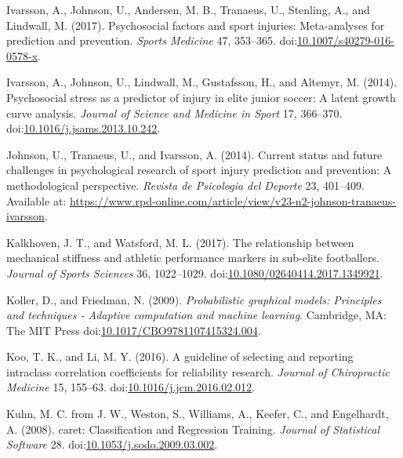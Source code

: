 \documentclass[
]{frontiersHLTH}
\newlength{\cslhangindent}
\newenvironment{cslreferences}%
  {\setlength{\parindent}{0pt}%
  \everypar{\setlength{\hangindent}{\cslhangindent}}\ignorespaces}%
  {\par}
\begin{document}
\begin{cslreferences}
\leavevmode\hypertarget{ref-Ivarsson2017}{}%
Ivarsson, A., Johnson, U., Andersen, M. B., Tranaeus, U., Stenling, A.,
and Lindwall, M. (2017). Psychosocial factors and sport injuries:
Meta-analyses for prediction and prevention. \emph{Sports Medicine} 47,
353--365.
doi:\href{https://doi.org/10.1007/s40279-016-0578-x}{10.1007/s40279-016-0578-x}.

\leavevmode\hypertarget{ref-Ivarsson2014}{}%
Ivarsson, A., Johnson, U., Lindwall, M., Gustafsson, H., and Altemyr, M.
(2014). Psychosocial stress as a predictor of injury in elite junior
soccer: A latent growth curve analysis. \emph{Journal of Science and
Medicine in Sport} 17, 366--370.
doi:\href{https://doi.org/10.1016/j.jsams.2013.10.242}{10.1016/j.jsams.2013.10.242}.

\leavevmode\hypertarget{ref-Johnson2014}{}%
Johnson, U., Tranaeus, U., and Ivarsson, A. (2014). Current status and
future challenges in psychological research of sport injury prediction
and prevention: A methodological perspective. \emph{Revista de
Psicologia del Deporte} 23, 401--409. Available at:
\url{https://www.rpd-online.com/article/view/v23-n2-johnson-tranaeus-ivarsson}.

\leavevmode\hypertarget{ref-Kalkhoven2018}{}%
Kalkhoven, J. T., and Watsford, M. L. (2017). The relationship between
mechanical stiffness and athletic performance markers in sub-elite
footballers. \emph{Journal of Sports Sciences} 36, 1022--1029.
doi:\href{https://doi.org/10.1080/02640414.2017.1349921}{10.1080/02640414.2017.1349921}.

\leavevmode\hypertarget{ref-Koller2009}{}%
Koller, D., and Friedman, N. (2009). \emph{Probabilistic graphical
models: Principles and techniques - Adaptive computation and machine
learning}. Cambridge, MA: The MIT Press
doi:\href{https://doi.org/10.1017/CBO9781107415324.004}{10.1017/CBO9781107415324.004}.

\leavevmode\hypertarget{ref-Koo2016}{}%
Koo, T. K., and Li, M. Y. (2016). A guideline of selecting and reporting
intraclass correlation coefficients for reliability research.
\emph{Journal of Chiropractic Medicine} 15, 155--63.
doi:\href{https://doi.org/10.1016/j.jcm.2016.02.012}{10.1016/j.jcm.2016.02.012}.

\leavevmode\hypertarget{ref-Kuhn2008}{}%
Kuhn, M. C. from J. W., Weston, S., Williams, A., Keefer, C., and
Engelhardt, A. (2008). caret: Classification and Regression Training.
\emph{Journal of Statistical Software} 28.
doi:\href{https://doi.org/10.1053/j.sodo.2009.03.002}{10.1053/j.sodo.2009.03.002}.


\end{cslreferences}
\end{document}

